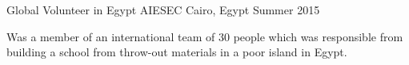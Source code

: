 \begin{cventries}
{\begin{cvitems}
     \end{cvitems}
    }
    \vspace{2mm}
  \cventry
    {Global Volunteer in Egypt } %
    {AIESEC} %
    {Cairo, Egypt} %
    {Summer 2015} %
    {
      \begin{cvitems} %
        \item {Was a member of an international team of 30 people which was responsible from building a school from throw-out materials in a poor island in Egypt. }
      \end{cvitems}
    }


\begin{comment}
Commented code
  \cventry
    {Reviewer and Participant} %
    {Algorithm Competition Programme} %
    {Inzva, Istanbul} %
    {Oct. 2018 - May. 2019} %
    {
      \begin{cvitems} %
        \item {Participated in the 30-week Algorithm Competition Programme which includes lectures, contests, and a variety of practises.}
      \end{cvitems}
    }
    \vspace{2mm}
\cventry
    {Member} %
    {Association for Computing Machinery Society} %
    {Koc Universtiy} %
    {Oct. 2017 - Present} %
    {
      \begin{cvitems} %
        \item {Responsible for organizing IoT and robotics related workshops, conferences for new members. }
        \item {Developing tech-projects to attend national and international competitions. }
      \end{cvitems}
    }

  \cventry
    {Global Volunteer in Egypt } %
    {AIESEC} %
    {Cairo, Egypt} %
    {Summer 2015} %
    {
      \begin{cvitems} %
        \item {Was a member of an international team of 30 people which was responsible from building a school from throw-out materials in a poor island in Egypt. }
      \end{cvitems}
    }


\end{comment}
\end{cventries}
